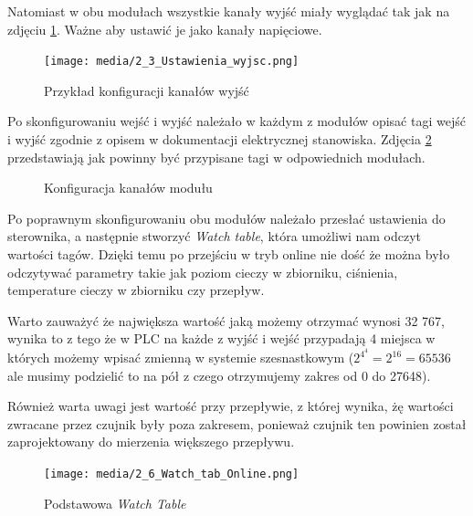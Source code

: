 \documentclass{article}
\begin{document}
Natomiast w obu modułach wszystkie kanały wyjść miały wyglądać tak jak na zdjęciu \ref{fig:zdj6}. Ważne aby ustawić je jako kanały napięciowe.
\begin{figure}[H]
    \centering
    \texttt{[image: media/2\_3\_Ustawienia\_wyjsc.png]}
    \caption{Przykład konfiguracji kanałów wyjść}
    \label{fig:zdj6}
\end{figure}
\newpage
Po skonfigurowaniu wejść i wyjść należało w każdym z modułów opisać tagi wejść i wyjść zgodnie z opisem w dokumentacji elektrycznej stanowiska. Zdjęcia \ref{fig:main2} przedstawiają jak powinny być przypisane tagi w odpowiednich modułach.
\begin{figure}[H]
    \centering
    \caption{Konfiguracja kanałów modułu}
    \label{fig:main2}
\end{figure}

Po poprawnym skonfigurowaniu obu modułów należało przesłać ustawienia do sterownika, a następnie stworzyć \textit{Watch table}, która umożliwi nam odczyt wartości tagów. Dzięki temu po przejściu w tryb online nie dość że można było odczytywać parametry takie jak poziom cieczy w zbiorniku, ciśnienia, temperature cieczy w zbiorniku czy przepływ. 

Warto zauważyć że największa wartość jaką możemy otrzymać wynosi 32 767, wynika to z tego że w PLC na każde z wyjść i wejść przypadają 4 miejsca w których możemy wpisać zmienną w systemie szesnastkowym ($2^{4^4} = 2^{16} = 65536$ ale musimy podzielić to na pół z czego otrzymujemy zakres od 0 do 27648).

Również warta uwagi jest wartość przy przepływie, z której wynika, żę wartości zwracane przez czujnik były poza zakresem, ponieważ czujnik ten powinien został zaprojektowany do mierzenia większego przepływu.
\begin{figure}[H]
    \centering
    \texttt{[image: media/2\_6\_Watch\_tab\_Online.png]}
    \caption{Podstawowa \textit{Watch Table}}
    \label{fig:zdj9}
\end{figure}
\end{document}
